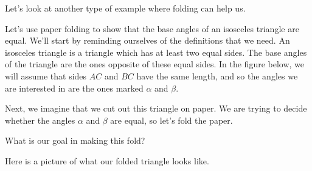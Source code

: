 \documentclass{ximera}
\begin{document}
Let's look at another type of example where folding can help us.
\begin{example}
Let's use paper folding to show that the base angles of an isosceles triangle are equal. We'll start by reminding ourselves of the definitions that we need. An isosceles triangle is a triangle which has at least two equal sides. The base angles of the triangle are the ones opposite of these equal sides. In the figure below, we will assume that sides $AC$ and $BC$ have the same length, and so the angles we are interested in are the ones marked $\alpha$ and $\beta$.
\begin{image}
\end{image}
Next, we imagine that we cut out this triangle on paper. We are trying to decide whether the angles $\alpha$ and $\beta$ are equal, so let's fold the paper.
\begin{question}
	What is our goal in making this fold?
	\begin{multipleChoice}
	\end{multipleChoice}
\end{question}
Here is a picture of what our folded triangle looks like.
\begin{image}
\end{image}
\end{example}
\end{document}
